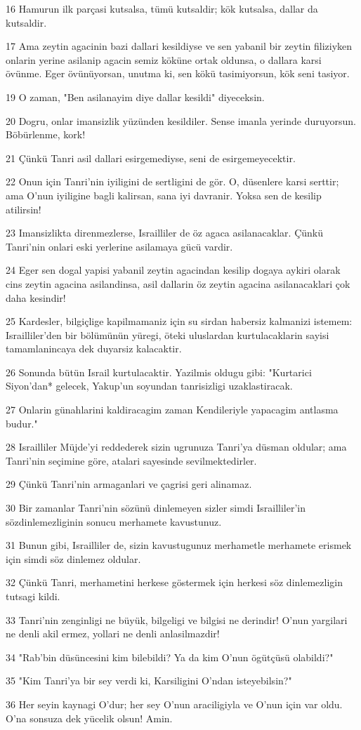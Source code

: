 \par 16 Hamurun ilk parçasi kutsalsa, tümü kutsaldir; kök kutsalsa, dallar da kutsaldir.
\par 17 Ama zeytin agacinin bazi dallari kesildiyse ve sen yabanil bir zeytin filiziyken onlarin yerine asilanip agacin semiz köküne ortak oldunsa, o dallara karsi övünme. Eger övünüyorsan, unutma ki, sen kökü tasimiyorsun, kök seni tasiyor.
\par 19 O zaman, "Ben asilanayim diye dallar kesildi" diyeceksin.
\par 20 Dogru, onlar imansizlik yüzünden kesildiler. Sense imanla yerinde duruyorsun. Böbürlenme, kork!
\par 21 Çünkü Tanri asil dallari esirgemediyse, seni de esirgemeyecektir.
\par 22 Onun için Tanri'nin iyiligini de sertligini de gör. O, düsenlere karsi serttir; ama O'nun iyiligine bagli kalirsan, sana iyi davranir. Yoksa sen de kesilip atilirsin!
\par 23 Imansizlikta direnmezlerse, Israilliler de öz agaca asilanacaklar. Çünkü Tanri'nin onlari eski yerlerine asilamaya gücü vardir.
\par 24 Eger sen dogal yapisi yabanil zeytin agacindan kesilip dogaya aykiri olarak cins zeytin agacina asilandinsa, asil dallarin öz zeytin agacina asilanacaklari çok daha kesindir!
\par 25 Kardesler, bilgiçlige kapilmamaniz için su sirdan habersiz kalmanizi istemem: Israilliler'den bir bölümünün yüregi, öteki uluslardan kurtulacaklarin sayisi tamamlanincaya dek duyarsiz kalacaktir.
\par 26 Sonunda bütün Israil kurtulacaktir. Yazilmis oldugu gibi: "Kurtarici Siyon'dan* gelecek, Yakup'un soyundan tanrisizligi uzaklastiracak.
\par 27 Onlarin günahlarini kaldiracagim zaman Kendileriyle yapacagim antlasma budur."
\par 28 Israilliler Müjde'yi reddederek sizin ugrunuza Tanri'ya düsman oldular; ama Tanri'nin seçimine göre, atalari sayesinde sevilmektedirler.
\par 29 Çünkü Tanri'nin armaganlari ve çagrisi geri alinamaz.
\par 30 Bir zamanlar Tanri'nin sözünü dinlemeyen sizler simdi Israilliler'in sözdinlemezliginin sonucu merhamete kavustunuz.
\par 31 Bunun gibi, Israilliler de, sizin kavustugunuz merhametle merhamete erismek için simdi söz dinlemez oldular.
\par 32 Çünkü Tanri, merhametini herkese göstermek için herkesi söz dinlemezligin tutsagi kildi.
\par 33 Tanri'nin zenginligi ne büyük, bilgeligi ve bilgisi ne derindir! O'nun yargilari ne denli akil ermez, yollari ne denli anlasilmazdir!
\par 34 "Rab'bin düsüncesini kim bilebildi? Ya da kim O'nun ögütçüsü olabildi?"
\par 35 "Kim Tanri'ya bir sey verdi ki, Karsiligini O'ndan isteyebilsin?"
\par 36 Her seyin kaynagi O'dur; her sey O'nun araciligiyla ve O'nun için var oldu. O'na sonsuza dek yücelik olsun! Amin.

